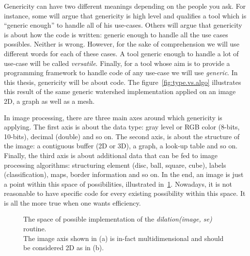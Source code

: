 Genericity can have two different meanings depending on the people you ask. For instance, some will argue that
genericity is high level and qualifies a tool which is ``generic enough'' to handle all of his use-cases. Others will
argue that genericity is about how the code is written: generic enough to handle all the use cases possibles. Neither is
wrong. However, for the sake of comprehension we will use different words for each of these cases. A tool generic enough
to handle a lot of use-case will be called \emph{versatile}. Finally, for a tool whose aim is to provide a programming
framework to handle code of any use-case we will use \emph{generic}. In this thesis, genericity will be about code. The
figure~\ref{fig:type.vs.algo} illustrates this result of the same generic watershed implementation applied on an image
2D, a graph as well as a mesh.

In image processing, there are three main axes around which genericity is applying. The first axis is about the data type:
gray level or RGB color (8-bits, 10-bits), decimal (double) and so on. The second axis, is about the structure of the
image: a contiguous buffer (2D or 3D), a graph, a look-up table and so on. Finally, the third axis is about additional
data that can be fed to image processing algorithms: structuring element (disc, ball, square, cube), labels
(classification), maps, border information and so on. In the end, an image is just a point within this space of
possibilities, illustrated in~\ref{fig:gen.espaceSAV}. Nowadays, it is not reasonable to have specific code for every
existing possibility within this space. It is all the more true when one wants efficiency.

\begin{figure}[htbp]
  \centering
  \subfloat[]{}
  \hfil
  \subfloat[]{}
  \caption{The space of possible implementation of the \emph{dilation(image, se)} routine.\\
    The image axis shown in (a) is in-fact multidimensional and should be considered 2D as in (b).}
  \label{fig:gen.espaceSAV}
\end{figure}

